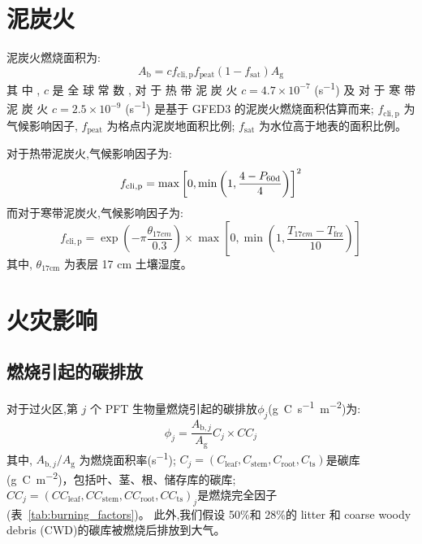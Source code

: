 \section{泥炭火}

泥炭火燃烧面积为:
\begin{equation}
  A_{\mathrm{b}}=c f_{\mathrm{c l i, p}} f_{\mathrm{peat}}\left(1-f_{\mathrm{sat}}\right) A_{\mathrm{g}}
\end{equation}
其 中 , $c$ 是 全 球 常 数 , 对 于 热 带 泥 炭 火 $c=4.7\times10^{-7}$ (\unit{s^{-1}}) 及 对 于 寒 带 泥 炭 火 $c=2.5\times10^{-9}$ (\unit{s^{-1}}) 是基于 GFED3 的泥炭火燃烧面积估算而来; $f_{\mathrm{cli,p}}$ 为气候影响因子, $f_{\mathrm{peat}}$ 为格点内泥炭地面积比例; $f_{\mathrm{sat}}$ 为水位高于地表的面积比例。

对于热带泥炭火,气候影响因子为:
\begin{equation}
  f_{\mathrm{c l i, p}}=\max \left[0, \min \left(1, \frac{4-P_{\rm 60d}}{4}\right)\right]^{2}
\end{equation}
而对于寒带泥炭火,气候影响因子为:
\begin{equation}
  f_{\mathrm{c l i, p}}=\exp \left(-\pi \frac{\theta_{17 c m}}{0.3}\right) \times \max \left[0, \min \left(1, \frac{T_{17 c m}-T_{\mathrm{frz}}}{10}\right)\right]
\end{equation}
其中, $\theta_{\text{17cm}}$ 为表层 17 cm 土壤湿度。

\section{火灾影响}
\subsection{燃烧引起的碳排放}

对于过火区,第 $j$ 个 PFT 生物量燃烧引起的碳排放${\phi}_{j} $(\unit{g.C.s^{-1}.m^{-2}})为:
%
\begin{equation}
  \phi_{j}=\frac{A_{\mathrm{b},j}}{A_{\mathrm{g}}} C_{j} \times C C_{j}
\end{equation}
%
其中, $A_{\mathrm{b},j}/A_{\mathrm {g}} $ 为燃烧面积率(\unit{s^{-1}}); $
C_{j}=\left(C_{\mathrm{leaf}}, C_{\mathrm{stem}}, C_{\mathrm{root}}, C_{\mathrm{t s}}\right)
$是碳库(\unit{g.C.m^{-2}})，包括叶、茎、根、储存库的碳库; $
C C_{j}=\left(C C_{\mathrm{leaf}}, C C_{\mathrm{stem}}, C C_{\mathrm{root}}, C C_{\mathrm{t s}}\right)_{j}
$是燃烧完全因子 (表~\ref{tab:burning_factors})。 此外,我们假设 50\%和 28\%的 litter 和 coarse woody debris (CWD)的碳库被燃烧后排放到大气。


